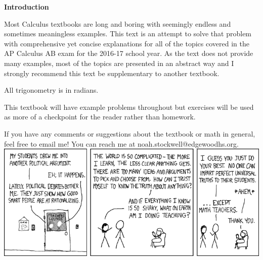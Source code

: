\par \textbf{Introduction}
\vspace{0.125in}
\par Most Calculus textbooks are long and boring with seemingly endless and sometimes meaningless examples. This text is an attempt to solve that problem with comprehensive yet concise explanations for all of the topics covered in the AP Calculus AB exam for the 2016-17 school year. As the text does not provide many examples, most of the topics are presented in an abstract way and I strongly recommend this text be supplementary to another textbook.\\\par All trigonometry is in radians.\\\par This textbook will have example problems throughout but exercises will be used as more of a checkpoint for the reader rather than homework.\\\par If you have any comments or suggestions about the textbook or math in general, feel free to email me! You can reach me at noah.stockwell@edgewoodhs.org.
\vfill
\includegraphics[width=\textwidth]{images/teachers.png}
\vfill

